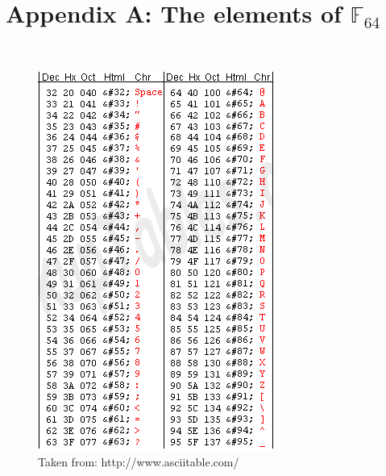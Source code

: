 \documentclass{article}
\begin{document}
\pagebreak
\section{Appendix A: The elements of $\mathbb{F}_{64}$}~
	\begin{figure}
	\centering
	\includegraphics[height=0.7\textheight]{ASCIITABLE}
	\caption{Taken from: http://www.asciitable.com/}
	\label{fig:ASCII}
	\end{figure}
	
\end{document}
